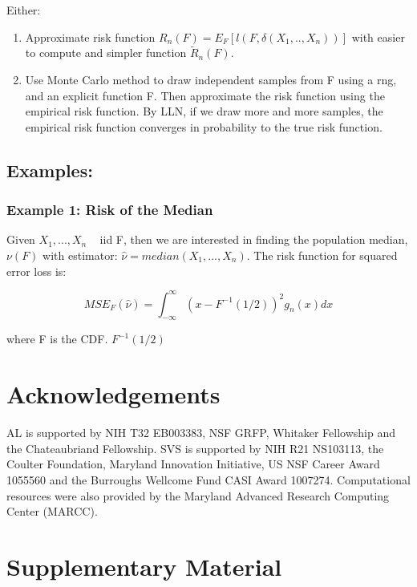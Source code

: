 \documentclass{article}
\newcommand{\beginsupplement}{%
        \setcounter{table}{0}
        \renewcommand{\thetable}{S\arabic{table}}%
        \setcounter{figure}{0}
        \renewcommand{\thefigure}{S\arabic{figure}}%
     }
\begin{document}
  	Either: 

  	\begin{enumerate}
  		\item Approximate risk function $R_n(F) = E_F [ l(F, \delta(X_1, .., X_n)) ]$ with easier to compute and simpler function $\tilde{R}_n(F)$.
  		\item Use Monte Carlo method to draw independent samples from F using a rng, and an explicit function F. Then approximate the risk function using the empirical risk function. By LLN, if we draw more and more samples, the empirical risk function converges in probability to the true risk function.
  	\end{enumerate}

  	\subsection{Examples:}

  		\subsubsection{Example 1: Risk of the Median}
	  		Given $X_1, ..., X_n$ ~ iid F, then we are interested in finding the population median, $\nu(F)$ with estimator: $\hat{\nu} = median(X_1, ..., X_n)$. The risk function for squared error loss is:

	  		$$MSE_F(\hat{\nu}) = \int_{-\infty}^{\infty} ( x - F^{-1}(1/2))^2 g_n(x) dx$$

	  		where F is the CDF. $F^{-1}(1/2)$
   	



\section{Acknowledgements}
  
  AL is supported by NIH T32 EB003383, NSF GRFP, Whitaker Fellowship and the Chateaubriand Fellowship. SVS is supported by NIH R21 NS103113, the Coulter Foundation, Maryland Innovation Initiative, US NSF Career Award 1055560 and the Burroughs Wellcome Fund CASI Award 1007274. Computational resources were also provided by the Maryland Advanced Research Computing Center (MARCC). 

\newpage
\section{Supplementary Material}
\beginsupplement
  
\clearpage
\newpage
  
\end{document}
